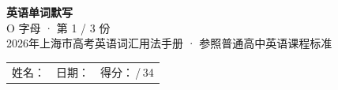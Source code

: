 \documentclass[10pt,a4paper]{article}
\begin{document}
\pagestyle{plain}

\begin{center}
{\LARGE\bfseries 英语单词默写}\\[0.22em]
{\large O 字母 · 第 1 / 3 份}\\[0.18em]
{\small 2026年上海市高考英语词汇用法手册 · 参照普通高中英语课程标准}
\end{center}

\vspace{0.25em}
\noindent\begin{tabular}{@{}p{}@{}p{}@{}p{}@{}}
姓名：\underline{\hspace{2.0cm}} & 日期：\underline{\hspace{2.0cm}} & 得分：\underline{\hspace{1.3cm}}\,/\,34 \\
\end{tabular}

\vspace{0.3em}

\vspace{0.08em}
\end{document}
